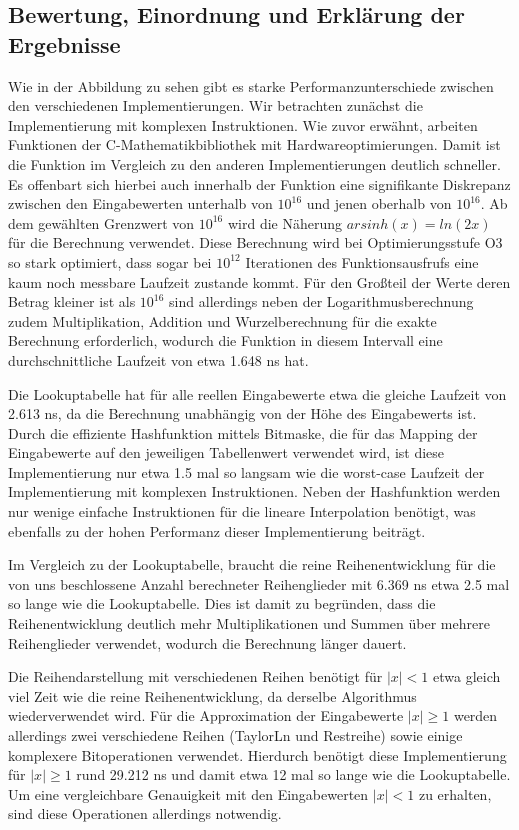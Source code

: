 \documentclass[course=erap] {aspdoc}
\begin{document}
     \subsection{Bewertung, Einordnung und Erklärung der Ergebnisse}

     Wie in der Abbildung zu sehen gibt es starke Performanzunterschiede zwischen den verschiedenen Implementierungen. Wir betrachten zunächst die Implementierung mit komplexen Instruktionen. Wie zuvor erwähnt, arbeiten Funktionen der C-Mathematikbibliothek mit Hardwareoptimierungen. Damit ist die Funktion im Vergleich zu den anderen Implementierungen deutlich schneller. Es offenbart sich hierbei auch innerhalb der Funktion eine signifikante Diskrepanz zwischen den Eingabewerten unterhalb von $10^{16}$ und jenen oberhalb von $10^{16}$. 
     Ab dem gewählten Grenzwert von $10^{16}$ wird die Näherung $arsinh(x) = ln(2x)$ für die Berechnung verwendet. Diese Berechnung wird bei Optimierungsstufe O3 so stark optimiert, dass sogar bei $10^{12}$ Iterationen des Funktionsausfrufs eine kaum noch messbare Laufzeit zustande kommt. Für den Großteil der Werte deren Betrag kleiner ist als $10^{16}$ sind allerdings neben der Logarithmusberechnung zudem Multiplikation, Addition und Wurzelberechnung für die exakte Berechnung erforderlich, wodurch die Funktion in diesem Intervall eine durchschnittliche Laufzeit von etwa 1.648 ns hat. 

     Die Lookuptabelle hat für alle reellen Eingabewerte etwa die gleiche Laufzeit von 2.613 ns, da die Berechnung unabhängig von der Höhe des Eingabewerts ist. Durch die effiziente Hashfunktion mittels Bitmaske, die für das Mapping der Eingabewerte auf den jeweiligen Tabellenwert verwendet wird, ist diese Implementierung nur etwa 1.5 mal so langsam wie die worst-case Laufzeit der Implementierung mit komplexen Instruktionen. Neben der Hashfunktion werden nur wenige einfache Instruktionen für die lineare Interpolation benötigt, was ebenfalls zu der hohen Performanz dieser Implementierung beiträgt.

     Im Vergleich zu der Lookuptabelle, braucht die reine Reihenentwicklung für die von uns beschlossene Anzahl berechneter Reihenglieder mit 6.369 ns etwa 2.5 mal so lange wie die Lookuptabelle. Dies ist damit zu begründen, dass die Reihenentwicklung deutlich mehr Multiplikationen und Summen über mehrere Reihenglieder verwendet, wodurch die Berechnung länger dauert.

     Die Reihendarstellung mit verschiedenen Reihen benötigt für $|x|<1$ etwa gleich viel Zeit wie die reine Reihenentwicklung, da derselbe Algorithmus wiederverwendet wird. Für die Approximation der Eingabewerte $|x|\geq1$ werden allerdings zwei verschiedene Reihen (TaylorLn und Restreihe) sowie einige komplexere Bitoperationen verwendet. Hierdurch benötigt diese Implementierung für $|x|\geq1$ rund 29.212 ns und damit etwa 12 mal so lange wie die Lookuptabelle. Um eine vergleichbare Genauigkeit mit den Eingabewerten $|x|<1$ zu erhalten, sind diese Operationen allerdings notwendig.
\end{document}
